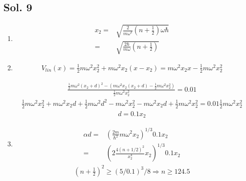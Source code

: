 \subsection*{Sol. 9}
\begin{enumerate}
    \item 
    \begin{align*}
        x_2 = &
        \sqrt{\frac{2}{m\omega^2}
        \left(n+\frac{1}{2}\right)\omega\hbar }\\
        = & 
        \sqrt{\frac{2\hbar}{m\omega}
        \left(n+\frac{1}{2}\right) }
    \end{align*}
    \item 
    \begin{align*}
        V_{lin}(x)
        =\frac{1}{2}m\omega^2x_2^2 + 
        m\omega^2 x_2(x-x_2)
        =m\omega^2 x_2x
        -\frac{1}{2}m\omega^2x_2^2
    \end{align*}

    
    \begin{align*}
        \frac{\frac{1}{2}m\omega^2 (x_2+d)^2
        -\left(
        m\omega^2 x_2(x_2+d)
        -\frac{1}{2}m\omega^2x_2^2
        \right)}
        {\frac{1}{2}m\omega^2 x_2^2}
        =0.01
    \end{align*}
    \begin{align*}
        \frac{1}{2}m\omega^2x^2_2+
        m\omega^2 x_2d
        +\frac{1}{2}m\omega^2 d^2
        -m\omega^2 x_2^2
        -m\omega^2 x_2d
        +\frac{1}{2}m\omega^2 x_2^2
        =0.01 
        \frac{1}{2}m\omega^2 x_2^2
    \end{align*}
    \begin{align*}
         d
        =0.1 
         x_2
    \end{align*}
    \item 
    \begin{align*}
        \alpha d
        =&\left(
        \frac{2m}{\hbar^2}
        m\omega^2
        x_2
        \right)^{1/3}
        0.1 
        x_2\\
        =&
        \left(
        2\frac{4(n+1/2)^2}{x_2^4}
        x_2
        \right)^{1/3}
        0.1 
        x_2
    \end{align*}
    \begin{align*}
        (n+\frac{1}{2})^{2}
        \geq
        (5/0.1)^3/8
        \Rightarrow n\geq 124.5
    \end{align*}
    
\end{enumerate}
